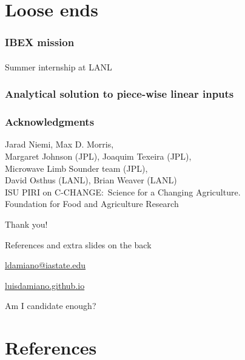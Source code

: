 \documentclass{snedecorbeamer}
\begin{document}
\section{Loose ends}

\begin{frame}
  \frametitle{IBEX mission}
  \framesubtitle{}

  Summer internship at LANL
\end{frame}

\begin{frame}
  \frametitle{Analytical solution to piece-wise linear inputs}
  \framesubtitle{}

\end{frame}

\begin{frame}[c]
  \frametitle{Acknowledgments}
  \centering

  {\small Jarad Niemi, Max D. Morris,\\
    Margaret Johnson (JPL), Joaquim Texeira (JPL), \\
    Microwave Limb Sounder team (JPL),\\
    David Osthus (LANL), Brian Weaver (LANL) \\
    ISU PIRI on C-CHANGE:~Science for a Changing Agriculture.\\
    Foundation for Food and Agriculture Research}

  \vfill

  {\huge Thank you!}

  \vfill

  {\tiny References and extra slides on the back}

  \href{ldamiano@iastate.edu}{
    ldamiano@iastate.edu}

  \href{https://luisdamiano.github.io/}{
    luisdamiano.github.io}

  \vfill

  {\tiny Am I candidate enough?}

\end{frame}

\appendix

\section{References}
\end{document}
